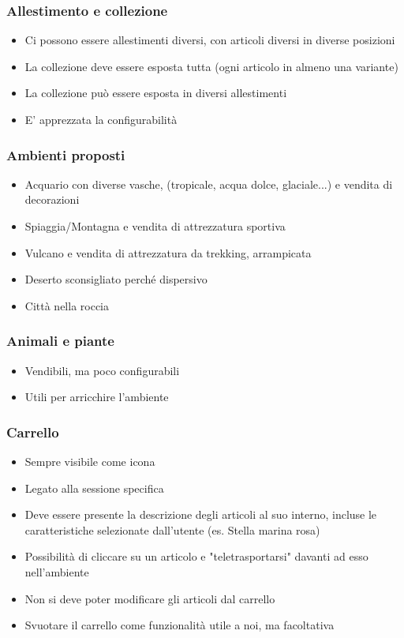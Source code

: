 \subsubsection{Allestimento e collezione}
\begin{itemize}
    \item Ci possono essere allestimenti diversi, con articoli diversi in diverse posizioni
    \item La collezione deve essere esposta tutta (ogni articolo in almeno una variante)
    \item La collezione può essere esposta in diversi allestimenti
    \item E' apprezzata la configurabilità
\end{itemize}
\subsubsection{Ambienti proposti}
\begin{itemize}
    \item Acquario con diverse vasche, (tropicale, acqua dolce, glaciale...) e vendita di decorazioni
    \item Spiaggia/Montagna e vendita di attrezzatura sportiva
    \item Vulcano e vendita di attrezzatura da trekking, arrampicata
    \item Deserto sconsigliato perché dispersivo
    \item Città nella roccia 
\end{itemize}
\subsubsection{Animali e piante}
\begin{itemize}
    \item Vendibili, ma poco configurabili
    \item Utili per arricchire l'ambiente
\end{itemize}
\subsubsection{Carrello}
\begin{itemize}
    \item Sempre visibile come icona  
    \item Legato alla sessione specifica 
    \item Deve essere presente la descrizione degli articoli al suo interno, 
        incluse le caratteristiche selezionate dall'utente (es. Stella marina rosa)
    \item Possibilità di cliccare su un articolo e "teletrasportarsi" davanti ad esso nell'ambiente  
    \item Non si deve poter modificare gli articoli dal carrello
    \item Svuotare il carrello come funzionalità utile a noi, ma facoltativa
\end{itemize}
